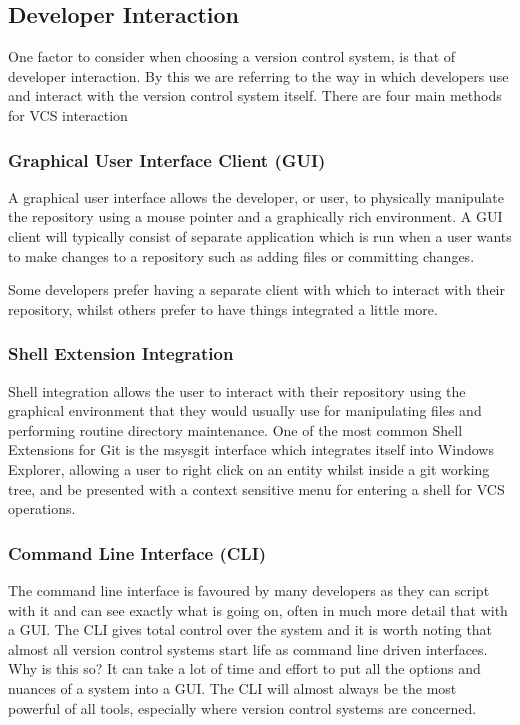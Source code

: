 \subsection{Developer Interaction}

One factor to consider when choosing a version control system, is that of developer interaction.
By this we are referring to the way in which developers use and interact with the version control system itself.
There are four main methods for VCS interaction

\subsubsection{Graphical User Interface Client (GUI)}

A graphical user interface allows the developer, or user, to physically manipulate the repository using a mouse pointer and a graphically rich environment.
A GUI client will typically consist of separate application which is run when a user wants to make changes to a repository such as adding files or committing changes.

Some developers prefer having a separate client with which to interact with their repository, whilst others prefer to have things integrated a little more.

\subsubsection{Shell Extension Integration}

Shell integration allows the user to interact with their repository using the graphical environment that they would usually use for manipulating files and performing routine directory maintenance.
One of the most common Shell Extensions for Git is the msysgit interface which integrates itself into Windows Explorer, allowing a user to right click on an entity whilst inside a git working tree, and be presented with a context sensitive menu for entering a shell for VCS operations.

\subsubsection{Command Line Interface (CLI)}

The command line interface is favoured by many developers as they can script with it and can see exactly what is going on, often in much more detail that with a GUI.
The CLI gives total control over the system and it is worth noting that almost all version control systems start life as command line driven interfaces.
Why is this so? It can take a lot of time and effort to put all the options and nuances of a system into a GUI.
The CLI will almost always be the most powerful of all tools, especially where version control systems are concerned.

